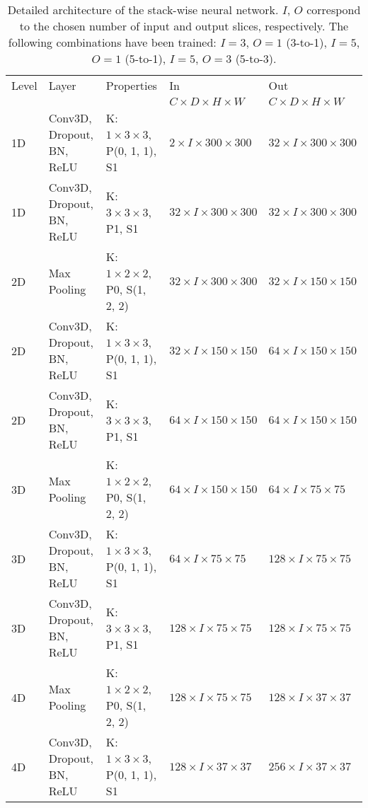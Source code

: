 \begin{sidewaystable}[htbp]
   \centering
   \caption[Architecture of Stack]{Detailed architecture of the stack-wise neural network. $I$, $O$ correspond to the chosen number of input and output slices, respectively. The following combinations have been trained: $I = 3$, $O = 1$ (3-to-1), $I = 5$, $O = 1$ (5-to-1), $I = 5$, $O = 3$ (5-to-3).}
   \begin{tabular}{l*{4}{l}}
      \toprule
      Level	& Layer				& Properties 					& In							& Out									\\
      &							&								& $C \times D \times H \times W$& $C \times D \times H \times W$		\\
      \midrule
      1D	& Conv3D, Dropout, BN, ReLU & K: $1 \times 3 \times 3$, P(0, 1, 1), S1	& $2 \times I \times 300 \times 300$	& $32 \times I \times 300 \times 300$	\\
      1D	& Conv3D, Dropout, BN, ReLU & K: $3 \times 3 \times 3$, P1, S1			& $32 \times I \times 300 \times 300$	& $32 \times I \times 300 \times 300$	\\
      2D	& Max Pooling				& K: $1 \times 2 \times 2$, P0, S(1, 2, 2)	& $32 \times I \times 300 \times 300$	& $32 \times I \times 150 \times 150$	\\
      2D	& Conv3D, Dropout, BN, ReLU & K: $1 \times 3 \times 3$, P(0, 1, 1), S1	& $32 \times I \times 150 \times 150$	& $64 \times I \times 150 \times 150$	\\
      2D	& Conv3D, Dropout, BN, ReLU & K: $3 \times 3 \times 3$, P1, S1			& $64 \times I \times 150 \times 150$	& $64 \times I \times 150 \times 150$	\\
      3D	& Max Pooling				& K: $1 \times 2 \times 2$, P0, S(1, 2, 2)	& $64 \times I \times 150 \times 150$	& $64 \times I \times 75 \times 75$		\\
      3D	& Conv3D, Dropout, BN, ReLU & K: $1 \times 3 \times 3$, P(0, 1, 1), S1	& $64 \times I \times 75 \times 75$		& $128 \times I \times 75 \times 75$	\\
      3D	& Conv3D, Dropout, BN, ReLU & K: $3 \times 3 \times 3$, P1, S1			& $128 \times I \times 75 \times 75$	& $128 \times I \times 75 \times 75$	\\
      4D	& Max Pooling				& K: $1 \times 2 \times 2$, P0, S(1, 2, 2)	& $128 \times I \times 75 \times 75$	& $128 \times I \times 37 \times 37$	\\
      4D	& Conv3D, Dropout, BN, ReLU & K: $1 \times 3 \times 3$, P(0, 1, 1), S1	& $128 \times I \times 37 \times 37$	& $256 \times I \times 37 \times 37$	\\

\end{tabular}
\end{sidewaystable}
